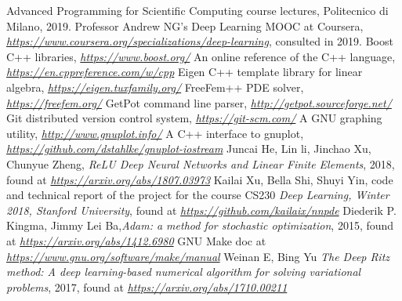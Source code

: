 \documentclass[12pt, a4paper]{report}
\theoremstyle{definition}
\begin{document}
\newpage
\begin{thebibliography}{10}
	
	 Advanced Programming for Scientific Computing course lectures, Politecnico di Milano, 2019.
	 Professor Andrew NG's Deep Learning MOOC at Coursera, \href{https://www.coursera.org/specializations/deep-learning}{\emph{https://www.coursera.org/specializations/deep-learning}}, consulted in 2019.
	 Boost C++ libraries, \href{https://www.boost.org/}{\emph{https://www.boost.org/}}
	 An online reference of the C++ language, \href{https://en.cppreference.com/w/cpp}{\emph{https://en.cppreference.com/w/cpp}}
	 Eigen C++ template library for linear algebra, \href{https://eigen.tuxfamily.org/}{\emph{https://eigen.tuxfamily.org/}}
	 FreeFem++ PDE solver, \href{https://freefem.org/}{\emph{https://freefem.org/}}
	 GetPot command line parser, \href{http://getpot.sourceforge.net/}{\emph{http://getpot.sourceforge.net/}}
	 Git distributed version control system, \href{https://git-scm.com/}{\emph{https://git-scm.com/}}
	 A GNU graphing utility, \href{http://www.gnuplot.info/}{\emph{http://www.gnuplot.info/}}
	 A C++ interface to gnuplot, \href{https://github.com/dstahlke/gnuplot-iostream}{\emph{https://github.com/dstahlke/gnuplot-iostream}}
	 Juncai He, Lin li, Jinchao Xu, Chunyue Zheng, \emph{ReLU Deep Neural Networks and Linear Finite Elements}, 2018, found at \href{https://arxiv.org/abs/1807.03973}{\emph{https://arxiv.org/abs/1807.03973}}
	 Kailai Xu, Bella Shi, Shuyi Yin, code and technical report of the project for the course CS230 \emph{Deep Learning, Winter 2018, Stanford University}, found at \href{https://github.com/kailaix/nnpde}{\emph{https://github.com/kailaix/nnpde}}
	 Diederik P. Kingma, Jimmy Lei Ba,\emph{Adam: a method for stochastic optimization}, 2015, found at
	\href{https://arxiv.org/abs/1412.6980}{\emph{https://arxiv.org/abs/1412.6980}} 
	 GNU Make doc at \href{https://www.gnu.org/software/make/manual}{\emph{https://www.gnu.org/software/make/manual}}
	 Weinan E, Bing Yu \emph{The Deep Ritz method: A deep learning-based numerical algorithm for solving variational problems}, 2017, found at \href{https://arxiv.org/abs/1710.00211}{\emph{https://arxiv.org/abs/1710.00211}}
	
\end{thebibliography}
\end{document}
